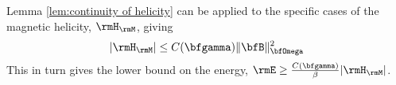     \begin{corollary}
        Lemma \ref{lem:continuity of helicity} can be applied to the specific cases of the magnetic helicity, $\rmH_{\rmM}$, giving
        \begin{equation}
            |\rmH_{\rmM}|  \leq  C(\bfgamma)\|\bfB\|_{\bfOmega}^{2}
        \end{equation}
        This in turn gives the lower bound on the energy, $\rmE  \geq  \frac{C(\bfgamma)}{\beta}|\rmH_{\rmM}|$.
    \end{corollary}


    \line